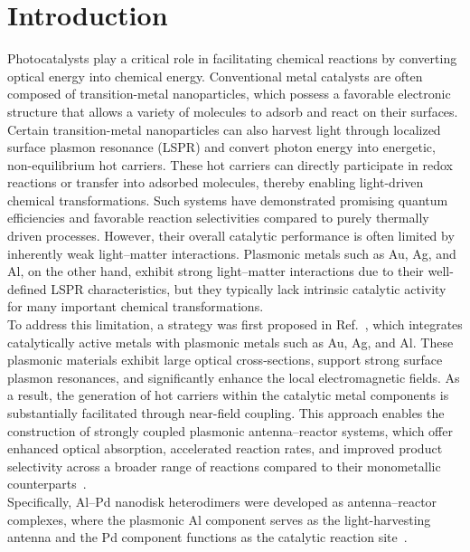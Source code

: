 \documentclass[journal]{IEEEtran}
\begin{document}
\section{Introduction}
\indent
Photocatalysts play a critical role in facilitating chemical reactions by converting optical energy into chemical energy. Conventional metal catalysts are often composed of transition-metal nanoparticles, which possess a favorable electronic structure that allows a variety of molecules to adsorb and react on their surfaces. Certain transition-metal nanoparticles can also harvest light through localized surface plasmon resonance (LSPR) and convert photon energy into energetic, non-equilibrium hot carriers. These hot carriers can directly participate in redox reactions or transfer into adsorbed molecules, thereby enabling light-driven chemical transformations. Such systems have demonstrated promising quantum efficiencies and favorable reaction selectivities compared to purely thermally driven processes\cite{doi:10.1021/nl502571b, https://doi.org/10.1002/anie.201308145}. However, their overall catalytic performance is often limited by inherently weak light–matter interactions\cite{10.1063/1.2734550}. Plasmonic metals such as Au, Ag, and Al, on the other hand, exhibit strong light–matter interactions due to their well-defined LSPR characteristics, but they typically lack intrinsic catalytic activity for many important chemical transformations\cite{doi:10.1021/acs.nanolett.6b03582}.\\
\indent
To address this limitation, a strategy was first proposed in Ref.~\cite{doi:10.1021/acs.nanolett.6b03582}, which integrates catalytically active metals with plasmonic metals such as Au, Ag, and Al. These plasmonic materials exhibit large optical cross-sections, support strong surface plasmon resonances, and significantly enhance the local electromagnetic fields. As a result, the generation of hot carriers within the catalytic metal components is substantially facilitated through near-field coupling. This approach enables the construction of strongly coupled plasmonic antenna–reactor systems, which offer enhanced optical absorption, accelerated reaction rates, and improved product selectivity across a broader range of reactions compared to their monometallic counterparts~\cite{https://doi.org/10.1002/advs.202302568}.\\
\indent
Specifically, Al–Pd nanodisk heterodimers were developed as antenna–reactor complexes, where the plasmonic Al component serves as the light-harvesting antenna and the Pd component functions as the catalytic reaction site~\cite{doi:10.1021/acs.nanolett.6b03582}.\\
\end{document}
